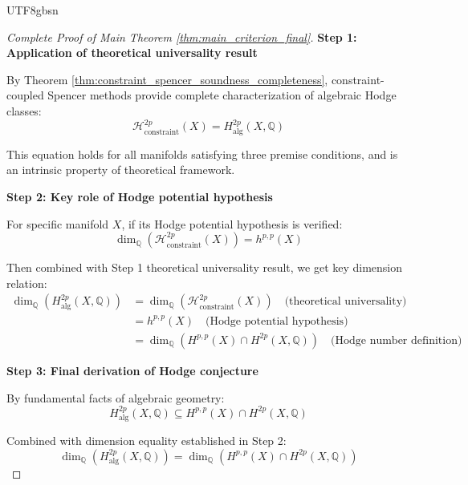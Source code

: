 \documentclass[a4paper,12pt]{extarticle}
\theoremstyle{definition}
\begin{document}
\begin{CJK}{UTF8}{gbsn}
\begin{proof}[Complete Proof of Main Theorem \ref{thm:main_criterion_final}]
\textbf{Step 1: Application of theoretical universality result}

By Theorem \ref{thm:constraint_spencer_soundness_completeness}, constraint-coupled Spencer methods provide complete characterization of algebraic Hodge classes:
\begin{equation}
\label{eq:universal_result_application}
\mathcal{H}_{\text{constraint}}^{2p}(X) = H_{\text{alg}}^{2p}(X, \mathbb{Q})
\end{equation}

This equation holds for all manifolds satisfying three premise conditions, and is an intrinsic property of theoretical framework.

\textbf{Step 2: Key role of Hodge potential hypothesis}

For specific manifold $X$, if its Hodge potential hypothesis is verified:
\begin{equation}
\label{eq:hodge_potential_verified}
\dim_{\mathbb{Q}}(\mathcal{H}_{\text{constraint}}^{2p}(X)) = h^{p,p}(X)
\end{equation}

Then combined with Step 1 theoretical universality result, we get key dimension relation:
\begin{align}
\dim_{\mathbb{Q}}(H_{\text{alg}}^{2p}(X, \mathbb{Q})) &= \dim_{\mathbb{Q}}(\mathcal{H}_{\text{constraint}}^{2p}(X)) \quad \text{(theoretical universality)}\label{eq:final_dimension_chain_1}\\
&= h^{p,p}(X) \quad \text{(Hodge potential hypothesis)}\label{eq:final_dimension_chain_2}\\
&= \dim_{\mathbb{Q}}(H^{p,p}(X) \cap H^{2p}(X, \mathbb{Q})) \quad \text{(Hodge number definition)}\label{eq:final_dimension_chain_3}
\end{align}

\textbf{Step 3: Final derivation of Hodge conjecture}

By fundamental facts of algebraic geometry:
\begin{equation}
\label{eq:algebraic_inclusion}
H_{\text{alg}}^{2p}(X, \mathbb{Q}) \subseteq H^{p,p}(X) \cap H^{2p}(X, \mathbb{Q})
\end{equation}

Combined with dimension equality established in Step 2:
\begin{equation}
\label{eq:dimension_equality}
\dim_{\mathbb{Q}}(H_{\text{alg}}^{2p}(X, \mathbb{Q})) = \dim_{\mathbb{Q}}(H^{p,p}(X) \cap H^{2p}(X, \mathbb{Q}))
\end{equation}


\end{proof}
\end{CJK}
\end{document}
